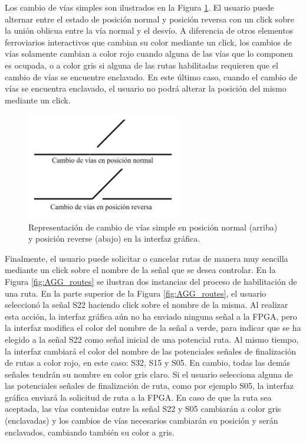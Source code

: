 	Los cambio de vías simples son ilustrados en la Figura \ref{fig:AGG_switch}. El usuario puede alternar entre el estado de posición normal y posición reversa con un click sobre la unión oblicua entre la vía normal y el desvío. A diferencia de otros elementos ferroviarios interactivos que cambian su color mediante un click, los cambios de vías solamente cambian a color rojo cuando alguna de las vías que lo componen es ocupada, o a color gris si alguna de las rutas habilitadas requieren que el cambio de vías se encuentre enclavado. En este último caso, cuando el cambio de vías se encuentra enclavado, el usuario no podrá alterar la posición del mismo mediante un click.
	
	\begin{figure}[H]
		\centering
		\includegraphics[width=0.6\textwidth]{AGG/images/AGG_switch}
		\centering\caption{Representación de cambio de vías simple en posición normal (arriba) y posición reverse (abajo) en la interfaz gráfica.}
		\label{fig:AGG_switch}
	\end{figure}

	Finalmente, el usuario puede solicitar o cancelar rutas de manera muy sencilla mediante un click sobre el nombre de la señal que se desea controlar. En la Figura \ref{fig:AGG_routes} se ilustran dos instancias del proceso de habilitación de una ruta. En la parte superior de la Figura \ref{fig:AGG_routes}, el usuario seleccionó la señal S22 haciendo click sobre el nombre de la misma. Al realizar esta acción, la interfaz gráfica aún no ha enviado ninguna señal a la FPGA, pero la interfaz modifica el color del nombre de la señal a verde, para indicar que se ha elegido a la señal S22 como señal inicial de una potencial ruta. Al mismo tiempo, la interfaz cambiará el color del nombre de las potenciales señales de finalización de rutas a color rojo, en este caso: S32, S15 y S05. En cambio, todas las demás señales tendrán su nombre en color gris claro. Si el usuario selecciona alguna de las potenciales señales de finalización de ruta, como por ejemplo S05, la interfaz gráfica enviará la solicitud de ruta a la FPGA. En caso de que la ruta sea aceptada, las vías contenidas entre la señal S22 y S05 cambiarán a color gris (enclavadas) y los cambios de vías necesarios cambiarán su posición y serán enclavados, cambiando también su color a gris.
	
